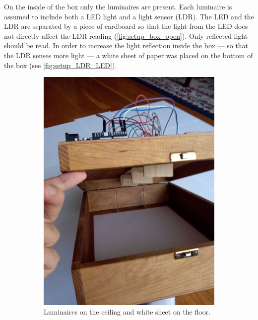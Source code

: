 On the inside of the box only the luminaires are present. Each luminaire is assumed to include both a LED light and a light sensor (LDR). The LED and the LDR are separated by a piece of cardboard so that the light from the LED does not directly affect the LDR reading (\autoref{fig:setup_box_open}). Only reflected light should be read. In order to increase the light reflection inside the box --- so that the LDR senses more light --- a white sheet of paper was placed on the bottom of the box (see \autoref{fig:setup_LDR_LED}).

\begin{figure}[h]
    \centering
    \begin{subfigure}[t]{0.49\textwidth}
        \centering
        \includegraphics[width=\textwidth]{img/setup_box_open}
        \caption{Luminaires on the ceiling and white sheet on the floor.}
        \label{fig:setup_box_open}
    \end{subfigure}
    \begin{subfigure}[t]{0.49\textwidth}

\end{subfigure}
\end{figure}
